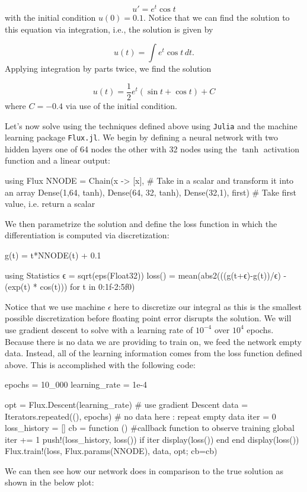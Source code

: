 \documentclass{CUP-JNL-DTM}%
\theoremstyle{definition}
\numberwithin{equation}{section}
\newcommand{\Julia}{\texttt{Julia} }
\begin{document}
\begin{equation}
	u' = e^t \cos t
\end{equation}
with the initial condition $u(0) = 0.1$. Notice that we can find the solution to this equation via integration, i.e., the solution is given by

\begin{equation}
	u(t) = \int e^t \cos t \, dt. 
\end{equation}
Applying integration by parts twice, we find the solution

\begin{equation}
	u(t) = \frac{1}{2}e^t(\sin t + \cos t) + C
\end{equation}
where $C = -0.4$ via use of the initial condition. 

Let's now solve using the techniques defined above using \Julia and the machine learning package \texttt{Flux.jl}. We begin by defining a neural network with two hidden layers one of 64 nodes the other with 32 nodes using the $\tanh$ activation function and a linear output: 

\begin{jllisting}
using Flux
NNODE = Chain(x -> [x], # Take in a scalar and transform it into an array
           Dense(1,64, tanh),
           Dense(64, 32, tanh),
           Dense(32,1),
           first) # Take first value, i.e. return a scalar
\end{jllisting}
We then parametrize the solution and define the loss function in which the differentiation is computed via discretization:

\begin{jllisting}
g(t) = t*NNODE(t) + 0.1

using Statistics
ϵ = sqrt(eps(Float32))
loss() = mean(abs2(((g(t+ϵ)-g(t))/ϵ) - (exp(t) * cos(t))) for t in 0:1f-2:5f0)
\end{jllisting}
Notice that we use machine $\epsilon$ here to discretize our integral as this is the smallest possible discretization before floating point error disrupts the solution. We will use gradient descent to solve with a learning rate of $10^{-4}$ over $10^4$ epochs. Because there is no data we are providing to train on, we feed the network empty data. Instead, all of the learning information comes from the loss function defined above. This is accomplished with the following code:

\begin{jllisting}
epochs = 10_000
learning_rate = 1e-4

opt = Flux.Descent(learning_rate) # use gradient Descent
data = Iterators.repeated((), epochs) # no data here : repeat empty data
iter = 0
loss_history = []
cb = function () #callback function to observe training
  global iter += 1
  push!(loss_history, loss())
  if iter %
    display(loss())
  end
end
display(loss())
Flux.train!(loss, Flux.params(NNODE), data, opt; cb=cb)
\end{jllisting}
We can then see how our network does in comparison to the true solution as shown in the below plot:
\end{document}
